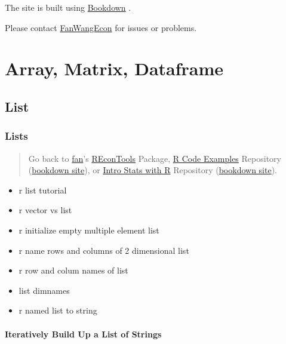\documentclass[
]{book}
\providecommand{\tightlist}{%
  \setlength{\itemsep}{0pt}\setlength{\parskip}{0pt}}
\begin{document}
The site is built using \href{https://bookdown.org/}{Bookdown} \citep{R-bookdown}.

Please contact \href{https://fanwangecon.github.io/}{FanWangEcon} for issues or problems.

\hypertarget{array-matrix-dataframe}{%
\chapter{Array, Matrix, Dataframe}\label{array-matrix-dataframe}}

\hypertarget{list}{%
\section{List}\label{list}}

\hypertarget{lists}{%
\subsection{Lists}\label{lists}}

\begin{quote}
Go back to \href{http://fanwangecon.github.io/}{fan}'s \href{https://fanwangecon.github.io/REconTools/}{REconTools} Package, \href{https://fanwangecon.github.io/R4Econ/}{R Code Examples} Repository (\href{https://fanwangecon.github.io/R4Econ/bookdown}{bookdown site}), or \href{https://fanwangecon.github.io/Stat4Econ/}{Intro Stats with R} Repository (\href{https://fanwangecon.github.io/Stat4Econ/bookdown}{bookdown site}).
\end{quote}

\begin{itemize}
\tightlist
\item
  r list tutorial
\item
  r vector vs list
\item
  r initialize empty multiple element list
\item
  r name rows and columns of 2 dimensional list
\item
  r row and colum names of list
\item
  list dimnames
\item
  r named list to string
\end{itemize}

\hypertarget{iteratively-build-up-a-list-of-strings}{%
\subsubsection{Iteratively Build Up a List of Strings}\label{iteratively-build-up-a-list-of-strings}}
\end{document}
